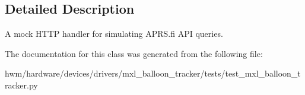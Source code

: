 \subsection{Detailed Description}
A mock H\-T\-T\-P handler for simulating A\-P\-R\-S.\-fi A\-P\-I queries. 



The documentation for this class was generated from the following file\-:\begin{DoxyCompactItemize}
\item 
hwm/hardware/devices/drivers/mxl\-\_\-balloon\-\_\-tracker/tests/test\-\_\-mxl\-\_\-balloon\-\_\-tracker.\-py\end{DoxyCompactItemize}
